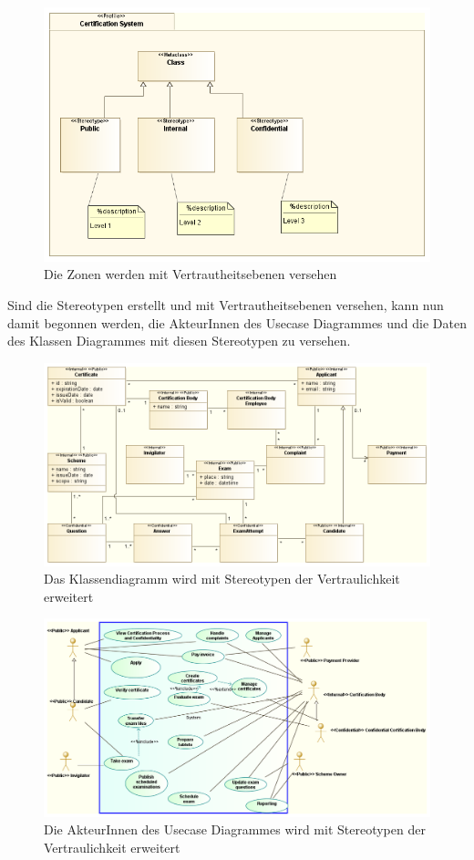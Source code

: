 \begin{figure}[H]
    \centering
    \includegraphics[scale=0.5]{uml/datastereotypeslevel.png}
    \caption{Die Zonen werden mit Vertrautheitsebenen versehen}
\end{figure}

Sind die Stereotypen erstellt und mit Vertrautheitsebenen versehen, kann nun damit begonnen werden, die AkteurInnen des Usecase Diagrammes und die Daten des Klassen Diagrammes mit diesen Stereotypen zu versehen.

\begin{figure}[H]
    \centering
    \includegraphics[scale=0.5]{uml/classstereotyped.png}
    \caption{Das Klassendiagramm wird mit Stereotypen der Vertraulichkeit erweitert}
\end{figure}

\begin{figure}[H]
    \centering
    \includegraphics[scale=0.4]{uml/stereotypedusecase.png}
    \caption{Die AkteurInnen des Usecase Diagrammes wird mit Stereotypen der Vertraulichkeit erweitert}
\end{figure}

